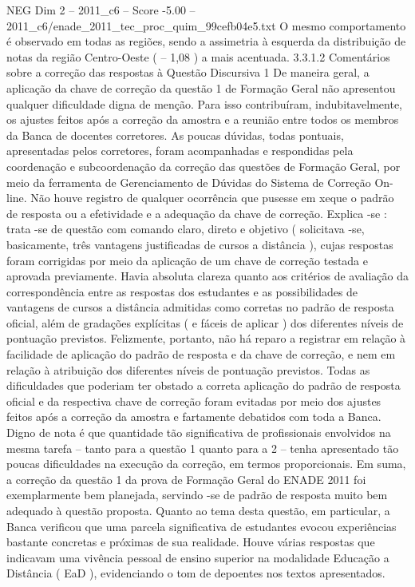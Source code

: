 \begin{textsample}{NEG Dim 2 – 2011\_c6 – Score -5.00 – 2011\_c6/enade\_2011\_tec\_proc\_quim\_99cefb04e5.txt}
O mesmo comportamento é observado em todas as regiões, sendo a assimetria à esquerda da distribuição de notas da região Centro-Oeste ( – 1,08 ) a mais acentuada. 3.3.1.2 Comentários sobre a correção das respostas à Questão Discursiva 1 De maneira geral, a aplicação da chave de correção da questão 1 de Formação Geral não apresentou qualquer dificuldade digna de menção.
Para isso contribuíram, indubitavelmente, os ajustes feitos após a correção da amostra e a reunião entre todos os membros da Banca de docentes corretores.
As poucas dúvidas, todas pontuais, apresentadas pelos corretores, foram acompanhadas e respondidas pela coordenação e subcoordenação da correção das questões de Formação Geral, por meio da ferramenta de Gerenciamento de Dúvidas do Sistema de Correção On-line.
Não houve registro de qualquer ocorrência que pusesse em xeque o padrão de resposta ou a efetividade e a adequação da chave de correção.
Explica -se : trata -se de questão com comando claro, direto e objetivo ( solicitava -se, basicamente, três vantagens justificadas de cursos a distância ), cujas respostas foram corrigidas por meio da aplicação de um chave de correção testada e aprovada previamente.
Havia absoluta clareza quanto aos critérios de avaliação da correspondência entre as respostas dos estudantes e as possibilidades de vantagens de cursos a distância admitidas como corretas no padrão de resposta oficial, além de gradações explícitas ( e fáceis de aplicar ) dos diferentes níveis de pontuação previstos.
Felizmente, portanto, não há reparo a registrar em relação à facilidade de aplicação do padrão de resposta e da chave de correção, e nem em relação à atribuição dos diferentes níveis de pontuação previstos.
Todas as dificuldades que poderiam ter obstado a correta aplicação do padrão de resposta oficial e da respectiva chave de correção foram evitadas por meio dos ajustes feitos após a correção da amostra e fartamente debatidos com toda a Banca.
Digno de nota é que quantidade tão significativa de profissionais envolvidos na mesma tarefa – tanto para a questão 1 quanto para a 2 – tenha apresentado tão poucas dificuldades na execução da correção, em termos proporcionais.
Em suma, a correção da questão 1 da prova de Formação Geral do ENADE 2011 foi exemplarmente bem planejada, servindo -se de padrão de resposta muito bem adequado à questão proposta.
Quanto ao tema desta questão, em particular, a Banca verificou que uma parcela significativa de estudantes evocou experiências bastante concretas e próximas de sua realidade.
Houve várias respostas que indicavam uma vivência pessoal de ensino superior na modalidade Educação a Distância ( EaD ), evidenciando o tom de depoentes nos textos apresentados.

\end{textsample}

